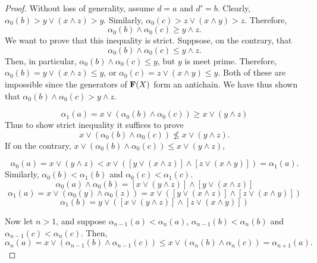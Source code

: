 \begin{proof}
Without loss of generality, assume $d = a$ and $d' = b$.
Clearly, $\alpha_0(b) > y\vee (x \wedge z) > y$. 
Similarly, $\alpha_0(c) > z\vee (x \wedge y) > z$. 
Therefore, 
\[\alpha_0(b) \wedge \alpha_0(c) \geq y \wedge z.\]
We want to prove that this inequality is strict.  Suppsose, on the contrary, that 
\[\alpha_0(b) \wedge \alpha_0(c) \leq y \wedge z.\]
Then, in particular, $\alpha_0(b) \wedge \alpha_0(c) \leq y$, but $y$ is meet prime.
Therefore, $\alpha_0(b) = y \vee (x \wedge z) \leq y$, or 
$\alpha_0(c) = z \vee (x \wedge y) \leq y$.  Both of these are impossible since the 
generators of $\mathbf{F}(X)$ form an antichain.
We have thus shown that $\alpha_0(b) \wedge \alpha_0(c) > y \wedge z$.


\[\alpha_1(a) = x \vee (\alpha_0(b) \wedge \alpha_0(c)) \geq x \vee (y \wedge z)\]
Thus to show strict inequality it suffices to prove
\[x \vee (\alpha_0(b) \wedge \alpha_0(c)) \nleq x \vee (y \wedge z).\]
If on the contrary, $x \vee (\alpha_0(b) \wedge \alpha_0(c)) \leq x \vee (y \wedge z)$,

\[
  \alpha_0(a) = x \vee (y \wedge z) < x \vee ([y \vee (x \wedge z)] \wedge [z \vee (x \wedge y)])  = \alpha_1(a).
\]
Similarly, $\alpha_0(b) < \alpha_1(b)$ and $\alpha_0(c) < \alpha_1(c)$.
\[
  \alpha_0(a) \wedge \alpha_0(b) = 
  [x \vee (y \wedge z)] \wedge [y \vee (x \wedge z)]
  \]
  \[
    \alpha_1(a)= x \vee (\alpha_0(y) \wedge \alpha_0(z)) = x \vee ([y \vee (x \wedge z)] \wedge [z \vee (x \wedge y)])
  \]
  \[
  \alpha_1(b)= y \vee ([x \vee (y \wedge z)] \wedge [z \vee (x \wedge y)])
  \]

  Now let $n>1$, and suppose $\alpha_{n-1}(a) < \alpha_n(a)$, 
$\alpha_{n-1}(b) < \alpha_n(b)$  and 
$\alpha_{n-1}(c) < \alpha_n(c)$.
Then, 
\[
  \alpha_n(a) = x \vee (\alpha_{n-1}(b) \wedge \alpha_{n-1}(c)) \leq x \vee (\alpha_{n}(b) \wedge \alpha_n(c)) = \alpha_{n+1}(a).
\]

\end{proof}

